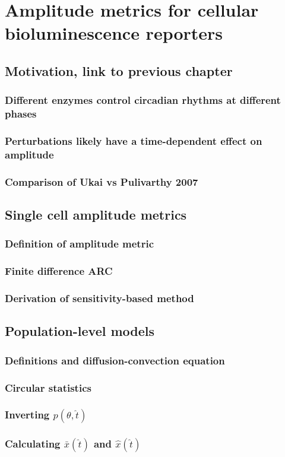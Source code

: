 \chapter{Amplitude metrics for cellular bioluminescence reporters}
\section{Motivation, link to previous chapter}\blindtext
\subsection{Different enzymes control circadian rhythms at different phases}\blindtext
\subsection{Perturbations likely have a time-dependent effect on amplitude}\blindtext
\subsection{Comparison of Ukai vs Pulivarthy 2007}\blindtext
\section{Single cell amplitude metrics}\blindtext
\subsection{Definition of amplitude metric}\blindtext
\subsection{Finite difference ARC}\blindtext
\subsection{Derivation of sensitivity-based method}\blindtext
\section{Population-level models}\blindtext
\subsection{Definitions and diffusion-convection equation}\blindtext
\subsection{Circular statistics}\blindtext
\subsection{Inverting $p(\theta, \hat{t})$}\blindtext
\subsection{Calculating $\bar{x}(\hat{t})$ and $\hat{x}(\hat{t})$}\blindtext
